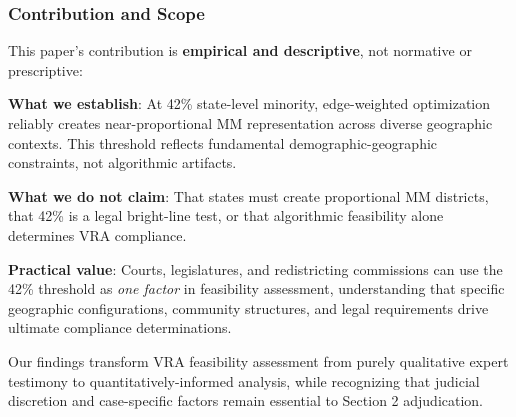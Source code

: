 \subsubsection{Contribution and Scope}

This paper's contribution is \textbf{empirical and descriptive}, not normative or prescriptive:

\textbf{What we establish}: At 42\% state-level minority, edge-weighted optimization reliably creates near-proportional MM representation across diverse geographic contexts. This threshold reflects fundamental demographic-geographic constraints, not algorithmic artifacts.

\textbf{What we do not claim}: That states must create proportional MM districts, that 42\% is a legal bright-line test, or that algorithmic feasibility alone determines VRA compliance.

\textbf{Practical value}: Courts, legislatures, and redistricting commissions can use the 42\% threshold as \emph{one factor} in feasibility assessment, understanding that specific geographic configurations, community structures, and legal requirements drive ultimate compliance determinations.

Our findings transform VRA feasibility assessment from purely qualitative expert testimony to quantitatively-informed analysis, while recognizing that judicial discretion and case-specific factors remain essential to Section 2 adjudication.
